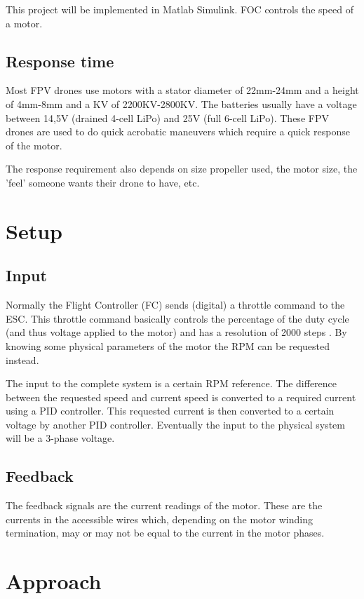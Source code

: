 \documentclass[]{report}
\begin{document}
This project will be implemented in Matlab Simulink. FOC controls the speed of a motor.

\section{Response time}
Most FPV drones use motors with a stator diameter of 22mm-24mm and a height of 4mm-8mm and a KV of 2200KV-2800KV. The batteries usually have a voltage between 14,5V (drained 4-cell LiPo) and 25V (full 6-cell LiPo). These FPV drones are used to do quick acrobatic maneuvers which require a quick response of the motor.

The response requirement also depends on size propeller used, the motor size, the 'feel' someone wants their drone to have, etc.

\chapter{Setup}

\section{Input}
Normally the Flight Controller (FC) sends (digital) a throttle command to the ESC. This throttle command basically controls the percentage of the duty cycle (and thus voltage applied to the motor) and has a resolution of 2000 steps \cite{DShot_Overview}. By knowing some physical parameters of the motor the RPM can be requested instead.

The input to the complete system is a certain RPM reference. The difference between the requested speed and current speed is converted to a required current using a PID controller. This requested current is then converted to a certain voltage by another PID controller. Eventually the input to the physical system will be a 3-phase voltage.

\section{Feedback}
The feedback signals are the current readings of the motor. These are the currents in the accessible wires which, depending on the motor winding termination, may or may not be equal to the current in the motor phases.

\chapter{Approach}
\end{document}
